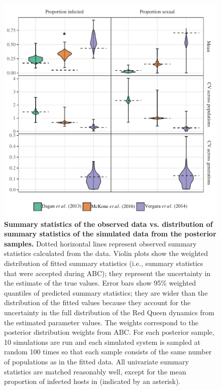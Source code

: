 \documentclass{article}\usepackage[]{graphicx}\usepackage[]{color}
\begin{document}
\begin{figure}[!ht]
\includegraphics[width=\textwidth]{../fig/smc_summary.pdf}
\caption{{\bf Summary statistics of the observed data vs. distribution of summary statistics of the simulated data from the posterior samples.}
Dotted horizontal lines represent observed summary statistics calculated from the data.
Violin plots show the weighted distribution of fitted summary statistics (i.e., summary statistics that were accepted during ABC);
they represent the uncertainty in the estimate of the true values.
Error bars show 95\% weighted quantiles of predicted summary statistics;
they are wider than the distribution of the fitted values because they account for the uncertainty in the full distribution of the Red Queen dynamics from the estimated parameter values.
The weights correspond to the posterior distribution weights from ABC.
For each posterior sample, 10 simulations are run and each simulated system is sampled at random 100 times so that each sample consists of the same number of populations as in the fitted data.
All univariate summary statistics are matched reasonably well, except for the mean proportion of infected hosts in \cite{mckone2016fine} (indicated by an asterisk). 
}
\label{fig:smcsumm}
\end{figure}
\end{document}
